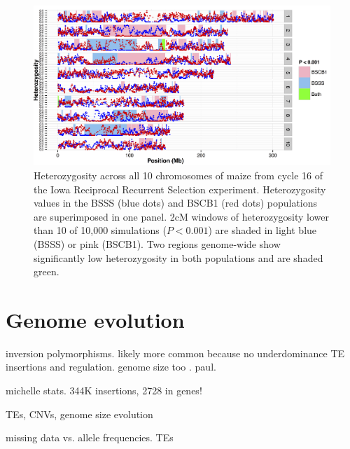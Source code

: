 \documentclass[11pt,letterpaper]{article}
\begin{document}
\begin{figure}[tb]   
  \begin{center}
\includegraphics[width=0.8\linewidth]{figs/gerke.png}
   \caption{Heterozygosity across all 10 chromosomes of maize from cycle 16 of the Iowa Reciprocal Recurrent Selection experiment. Heterozygosity values in the BSSS  (blue dots) and BSCB1 (red dots) populations are superimposed in one panel. 2cM windows of heterozygosity lower than 10 of 10,000 simulations ($P<0.001$) are shaded in light blue (BSSS) or pink (BSCB1). Two regions genome-wide show significantly low heterozygosity in both populations and are shaded green.} 
    \label{fig:heterotic}
  \end{center}
\end{figure}

\section*{Genome evolution}

inversion polymorphisms. likely more common because no underdominance \citep{maguire1966relationship}
TE insertions \citep{studer2011identification, makarevitch2015transposable} and regulation. 
genome size too \citep{tenaillon2011genome}. paul.

michelle stats. 344K insertions, 2728 in genes!

TEs, CNVs, genome size evolution

missing data vs. allele frequencies.
TEs
\end{document}
